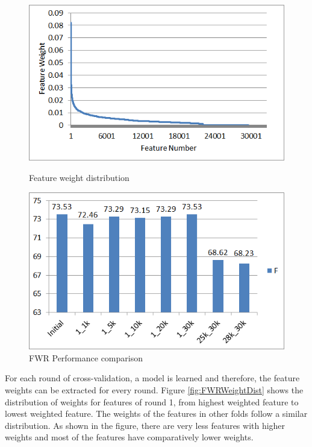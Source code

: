 \begin{figure}
\centering
\begin{minipage}{.5\textwidth}
  \centering
  \includegraphics[width=.95\textwidth]{figures/FWRWeightDist.png}
  \caption{Feature weight distribution}
  \label{fig:FWRWeightDist}
\end{minipage}%
\begin{minipage}{.5\textwidth}
  \centering
  \includegraphics[width=.95\textwidth]{figures/FWRPerformance.png}
  \caption{FWR Performance comparison}
  \label{fig:FWRPerfComp}
\end{minipage}
\end{figure}

For each round of cross-validation, a model is learned and therefore, the feature weights can be extracted for every round. Figure \ref{fig:FWRWeightDist} shows the distribution of weights for features of round 1, from highest weighted feature to lowest weighted feature. The weights of the features in other folds follow a similar distribution. As shown in the figure, there are very less features with higher weights and most of the features have comparatively lower weights.

